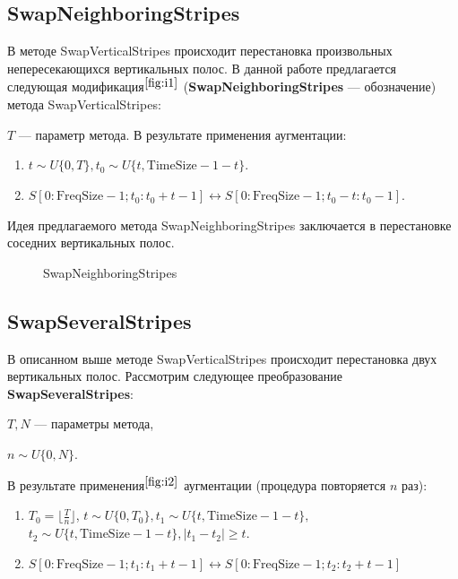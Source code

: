 \documentclass[12pt, fleqn]{article}
\begin{document}
\subsection{SwapNeighboringStripes}

В методе SwapVerticalStripes происходит перестановка произвольных непересекающихся вертикальных полос. В данной работе предлагается следующая модификация$^{\ref{fig:i1}}$ (\textbf{SwapNeighboringStripes} --- обозначение) метода SwapVerticalStripes: 

$T$ --- параметр метода. В результате применения аугментации:
    \begin{enumerate}
        \item $t \sim U\{0, T\}, t_0 \sim U\{t, \text{TimeSize} - 1 - t\}.$
        \item $S[0:\text{FreqSize} - 1; t_0: t_0 + t - 1] \leftrightarrow S[0:\text{FreqSize} - 1; t_0 - t: t_0 - 1].$
    \end{enumerate}
Идея предлагаемого метода SwapNeighboringStripes заключается в перестановке соседних вертикальных полос.

\begin{figure}[ht!]
    	\caption{SwapNeighboringStripes}
    	\label{fig:i1}
\end{figure}

\subsection{SwapSeveralStripes}

В описанном выше методе SwapVerticalStripes происходит перестановка двух вертикальных полос. Рассмотрим следующее преобразование \textbf{SwapSeveralStripes}:

$T, N$ --- параметры метода, 

$n \sim U\{0, N\}$. 

В результате применения$^{\ref{fig:i2}}$ аугментации (процедура повторяется $n$ раз):
\begin{enumerate}
    \item $T_0 = \lfloor \frac{T}{n} \rfloor$, $t \sim U\{0, T_0\}, t_1 \sim U\{t, \text{TimeSize} - 1 - t\},$ \newline $t_2 \sim U\{t, \text{TimeSize} - 1 - t\}, |t_1 - t_2| \geq t$.
    \item $S[0:\text{FreqSize} - 1; t_1: t_1 + t - 1] \leftrightarrow S[0:\text{FreqSize} - 1; t_2 : t_2 + t - 1]$
\end{enumerate}
\end{document}
